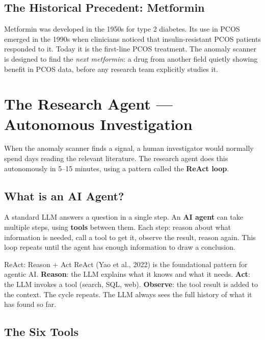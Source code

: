 \documentclass[11pt,a4paper]{article}
\begin{document}
\subsection{The Historical Precedent: Metformin}

Metformin was developed in the 1950s for type 2 diabetes. Its use in PCOS emerged
in the 1990s when clinicians noticed that insulin-resistant PCOS patients responded
to it. Today it is the first-line PCOS treatment. The anomaly scanner is designed
to find the \textit{next metformin}: a drug from another field quietly showing
benefit in PCOS data, before any research team explicitly studies it.

\section{The Research Agent --- Autonomous Investigation}

When the anomaly scanner finds a signal, a human investigator would normally
spend days reading the relevant literature. The research agent does this
autonomously in 5--15 minutes, using a pattern called the \textbf{ReAct loop}.

\subsection{What is an AI Agent?}

A standard LLM answers a question in a single step. An \textbf{AI agent} can
take multiple steps, using \textbf{tools} between them. Each step: reason about
what information is needed, call a tool to get it, observe the result, reason
again. This loop repeats until the agent has enough information to draw a conclusion.

\begin{concept}{ReAct: Reason + Act}
ReAct (Yao et al., 2022) is the foundational pattern for agentic AI.
\textbf{Reason}: the LLM explains what it knows and what it needs.
\textbf{Act}: the LLM invokes a tool (search, SQL, web).
\textbf{Observe}: the tool result is added to the context.
The cycle repeats. The LLM always sees the full history of what it has found so far.
\end{concept}

\subsection{The Six Tools}
\end{document}
